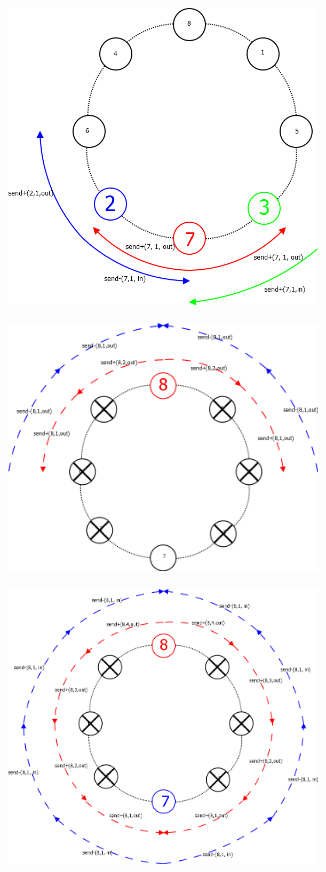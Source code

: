 \begin{minipage}{\linewidth}
	\centering\includegraphics[width=310px]{gfx/HS_p1.png}
	\label{img:hs_p1}
\end{minipage}

\begin{minipage}{\linewidth}
	\centering\includegraphics[width=310px]{gfx/HS_p2.png}
	\label{img:hs_p2}
\end{minipage}

\begin{minipage}{\linewidth}
    \centering\includegraphics[width=310px]{gfx/HS_p3.png}
    \label{img:hs_p3}
\end{minipage}

